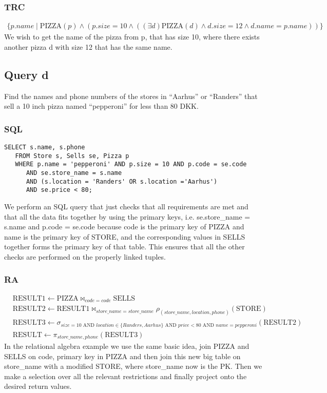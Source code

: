 \documentclass{article}
\theoremstyle{remark}
\numberwithin{equation}{section}
\begin{document}
\subsubsection{TRC}
\begin{align*}
    \{p.name\mid\text{PIZZA}(p) \wedge( p.size = 10 \wedge ((\exists d) \text{PIZZA}(d)\wedge d.size = 12 \wedge d.name = p.name))\}
\end{align*}
We wish to get the name of the pizza from p, that has size 10, where there exists another pizza d with size 12 that has the same name. 
\subsection{Query d}
Find the names and phone numbers of the stores in “Aarhus” or “Randers” that sell a
10 inch pizza named “pepperoni” for less than 80 DKK.
\subsubsection{SQL}
\begin{verbatim}
SELECT s.name, s.phone
   FROM Store s, Sells se, Pizza p
   WHERE p.name = 'pepperoni' AND p.size = 10 AND p.code = se.code 
      AND se.store_name = s.name 
      AND (s.location = 'Randers' OR s.location ='Aarhus')
      AND se.price < 80;  
\end{verbatim}
We perform an SQL query that just checks that all requirements are met and that all the data fits together by using the primary keys, i.e. se.store\_name = s.name and p.code = se.code because code is the primary key of PIZZA and name is the primary key of STORE, and the corresponding values in SELLS together forms the primary key of that table. This ensures that all the other checks are performed on the properly linked tuples.
\subsubsection{RA}
\begin{align*}
    &\text{RESULT1}\leftarrow\text{PIZZA}\bowtie_{code=code}\text{SELLS}\\
    &\text{RESULT2}\leftarrow\text{RESULT1}\bowtie_{store\_name = store\_name}\rho_{(store\_name,location,phone)}(\text{STORE})\\
    &\text{RESULT3}\leftarrow\sigma_{size = 10 \text{ AND } location \in\{Randers,Aarhus\}\text{ AND }price<80\text{ AND }name = pepperoni}(\text{RESULT2})\\
    &\text{RESULT}\leftarrow \pi_{store\_name,phone}(\text{RESULT3})
\end{align*}
In the relational algebra example we use the same basic idea, join PIZZA and SELLS on code, primary key in PIZZA and then join this new big table on store\_name with a modified STORE, where store\_name now is the PK. Then we make a selection over all the relevant restrictions and finally project onto the desired return values.
\end{document}
